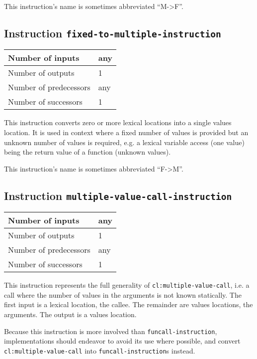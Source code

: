 This instruction's name is sometimes abbreviated ``M->F''.

\subsection{Instruction \texttt{fixed-to-multiple-instruction}}
\label{mir-instruction-fixed-to-multiple}

\begin{tabular}{|l|l|}
  \hline
  Number of inputs & any\\
  \hline
  Number of outputs & 1\\
  \hline
  Number of predecessors & any\\
  \hline
  Number of successors & 1\\
  \hline
\end{tabular}

This instruction converts zero or more lexical locations into a single
values location. It is used in context where a fixed number of values
is provided but an unknown number of values is required, e.g. a
lexical variable access (one value) being the return value of a
function (unknown values).

This instruction's name is sometimes abbreviated ``F->M''.

\subsection{Instruction \texttt{multiple-value-call-instruction}}
\label{mir-instruction-multiple-value-call}

\begin{tabular}{|l|l|}
  \hline
  Number of inputs & any\\
  \hline
  Number of outputs & 1\\
  \hline
  Number of predecessors & any\\
  \hline
  Number of successors & 1\\
  \hline
\end{tabular}

This instruction represents the full generality of
\texttt{cl:multiple-value-call}, i.e. a call where the number of
values in the arguments is not known statically. The first input is
a lexical location, the callee. The remainder are values locations,
the arguments. The output is a values location.

Because this instruction is more involved than
\texttt{funcall-instruction}, implementations should endeavor to
avoid its use where possible, and convert
\texttt{cl:multiple-value-call} into \texttt{funcall-instruction}s
instead.

